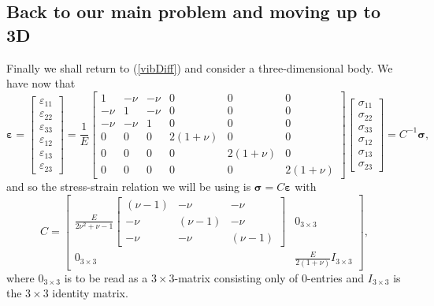 \documentclass[paper=a4, fontsize=11pt]{scrartcl} %
\begin{document}
\subsection*{Back to our main problem and moving up to 3D}
Finally we shall return to (\ref{vibDiff}) and consider a three-dimensional body. We have now that 
\begin{equation*}
\boldsymbol{\varepsilon} = 
\begin{bmatrix}
\varepsilon_{11} \\
\varepsilon_{22} \\
\varepsilon_{33} \\
\varepsilon_{12} \\
\varepsilon_{13} \\
\varepsilon_{23}
\end{bmatrix}
= \frac{1}{E}\begin{bmatrix}
1 & -\nu & -\nu & 0 & 0 & 0 \\
-\nu & 1 & -\nu & 0 & 0 & 0 \\
-\nu & -\nu & 1 & 0 & 0 & 0 \\
0 & 0 & 0 & 2(1+\nu) & 0 & 0 \\
0 & 0 & 0 & 0 & 2(1+\nu) & 0 \\
0 & 0 & 0 & 0 & 0 & 2(1+\nu)
\end{bmatrix}
\begin{bmatrix}
\sigma_{11} \\ \sigma_{22} \\ \sigma_{33} \\ \sigma_{12} \\ \sigma_{13} \\ \sigma_{23}
\end{bmatrix}
= C^{-1}\boldsymbol{\sigma},
\end{equation*}
 and so the stress-strain relation we will be using is $\boldsymbol{\sigma} = C\boldsymbol{\varepsilon}$ with
\begin{equation*}
C =
\begin{bmatrix}
\frac{E}{2\nu^2+\nu-1}\begin{bmatrix}
(\nu -1) & -\nu & -\nu \\
-\nu & (\nu-1) & -\nu \\
-\nu & -\nu & (\nu-1)
\end{bmatrix}
&
0_{3\times 3} \\
0_{3\times 3} &
\frac{E}{2(1+\nu)}I_{3\times 3}
\end{bmatrix},
\end{equation*}
where $0_{3\times 3}$ is to be read as a $3\times 3$-matrix consisting only of $0$-entries and $I_{3\times 3}$ is the $3\times 3$ identity matrix.
\end{document}
